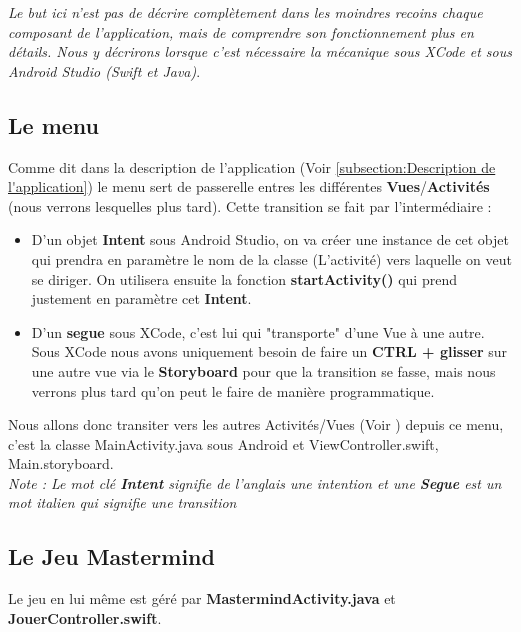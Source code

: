 \documentclass{article}
\begin{document}
\textit{Le but ici n'est pas de décrire complètement dans les moindres recoins chaque composant de l'application, mais de comprendre son fonctionnement plus en détails. Nous y décrirons lorsque c'est nécessaire la mécanique sous XCode et sous Android Studio (Swift et Java)}.

\subsection{Le menu}
\label{subsection :Le Menu}

Comme dit dans la description de l'application (Voir \ref{subsection:Description de l'application}) le menu sert de passerelle entres les différentes \textbf{Vues}/\textbf{Activités} (nous verrons lesquelles plus tard). 
Cette transition se fait par l'intermédiaire : 

\begin{itemize}
\item D'un objet \textbf{Intent} sous Android Studio, on va créer une instance de cet objet qui prendra en paramètre le nom de la classe (L'activité) vers laquelle on veut se diriger. On utilisera ensuite la fonction \textbf{startActivity()} qui prend justement en paramètre cet \textbf{Intent}.
\\
\item D'un \textbf{segue} sous XCode, c'est lui qui "transporte" d'une Vue à une autre. Sous XCode nous avons uniquement besoin de faire un \textbf{CTRL + glisser} sur une autre vue via le \textbf{Storyboard} pour que la transition se fasse, mais nous verrons plus tard qu'on peut le faire de manière programmatique. 



\end{itemize}

Nous allons donc transiter vers les autres Activités/Vues (Voir ) depuis ce menu, c'est la classe MainActivity.java sous Android et ViewController.swift, Main.storyboard.
\\

\textit{Note : Le mot clé \textbf{Intent} signifie de l'anglais une intention et une \textbf{Segue} est un mot italien qui signifie une transition}


\subsection{Le Jeu Mastermind}

Le jeu en lui même est géré par \textbf{MastermindActivity.java} et \textbf{JouerController.swift}. 
\end{document}
